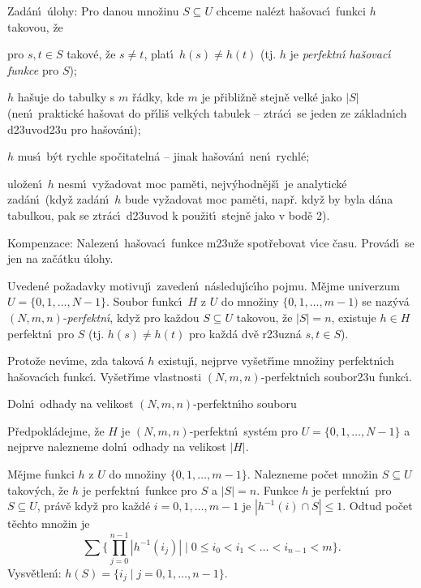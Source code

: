 \flushpar Zad\'an\'\i\ \'ulohy: Pro danou mno\v zinu $S\subseteq 
U$ chceme 
nal\'ezt ha\v so\-va\-c\'\i\ funkci $h$ takovou, \v ze
\roster
\item
pro $s,t\in S$ takov\'e, \v ze $s\ne t$, plat\'\i\ $h(s)\ne h(
t)$ (tj. $h$ je \emph{perfektn\'\i} \emph{ha\v sovac\'\i} \emph{funkce} pro 
$S$); 
\item 
$h$ ha\v suje do tabulky s $m$ \v r\'adky, kde $m$ je p\v ribli\v zn\v e 
stejn\v e velk\'e jako $|S|$ (nen\'\i\ praktick\'e ha\v sovat do p\v r\'\i li\v s 
velk\'ych tabulek -- ztr\'ac\'\i\ se jeden ze z\'akladn\'\i ch 
d\accent23uvod\accent23u pro ha\v sov\'an\'\i); 
\item 
$h$ mus\'\i\ b\'yt rychle spo\v citateln\'a -- jinak ha\v sov\'an\'\i\ 
nen\'\i\ rychl\'e;
\item 
ulo\v zen\'\i\ $h$ nesm\'\i\ vy\v zadovat moc pam\v eti, 
nejv\'yhodn\v ej\v s\'\i\ je ana\-lytick\'e zad\'an\'\i\ (kdy\v z zad\'an\'\i\ $
h$ bude 
vy\v zadovat moc pam\v eti, nap\v r. kdy\v z by byla d\'ana tabulkou, 
pak se ztr\'ac\'\i\ d\accent23uvod k pou\v zit\'\i\ stejn\v e jako v 
bod\v e 2).
\endroster


\flushpar Kompenzace: Nalezen\'\i\ ha\v sovac\'\i\ funkce 
m\accent23u\v ze spot\v rebovat v\'\i ce \v casu. Prov\'ad\'\i\ se jen na 
za\v c\'atku \'ulohy. 
\medskip

\flushpar Uveden\'e po\v zadavky motivuj\'\i\ zaveden\'\i\ 
n\'asleduj\'\i c\'\i ho pojmu.\newline 
M\v ejme univerzum $U=\{0,1,\dots,N-1\}$. Soubor funkc\'\i\ $H$ z 
$U$ do mno\v ziny $\{0,1,\dots,m-1)$ se naz\'yv\'a 
$(N,m,n)$-\emph{perfektn\'\i}, kdy\v z pro ka\v zdou $S\subseteq 
U$ 
takovou, \v ze $|S|=n$, existuje $h\in H$ perfektn\'\i\ pro $S$ (tj. 
$h(s)\ne h(t)$ pro ka\v zd\'a dv\v e r\accent23uzn\'a $s,t\in S$).

\flushpar Proto\v ze nev\'\i me, zda takov\'a $h$ existuj\'\i , nejprve 
vy\v set\v r\'\i me mno\-\v zi\-ny perfektn\'\i ch ha\v sovac\'\i ch 
funkc\'\i . Vy\v set\v r\'\i me vlastnosti $(N,m,n)$-perfektn\'\i ch 
soubor\accent23u funkc\'\i .
\medskip

\subhead
Doln\'\i\ odhady na velikost $(N,m,n)$-perfektn\'\i ho souboru
\endsubhead
\smallskip

\flushpar P\v redpokl\'adejme, \v ze $H$  je $(N,m,n)$-perfektn\'\i\ 
syst\'em pro $U=\{0,1,\dots,N-1\}$ a nejprve nalezneme doln\'\i\ 
odhady na velikost $|H|$.
\medskip

\flushpar M\v ejme funkci $h$ z $U$ do mno\v ziny $\{0,1,\dots,m-
1\}$. 
Nalezneme po\v cet mno\v zin $S\subseteq U$ takov\'ych, \v ze  
$h$ je perfektn\'\i\ funkce pro $S$ a $|S|=n$. Funkce $h$ je perfektn\'\i\ pro 
$S\subseteq U$, pr\'av\v e kdy\v z pro ka\v zd\'e $i=0,1,\dots,m-
1$ je 
$|h^{-1}(i)\cap S|\le 1$. Odtud po\v cet t\v echto mno\v zin je
$$\sum \{\prod_{j=0}^{n-1}|h^{-1}(i_j)|\mid 0\le i_0<i_1<\dots<i_{
n-1}<m\}.$$
\flushpar Vysv\v etlen\'\i : $h(S)=\{i_j\mid j=0,1,\dots,n-1\}$.
\medskip

